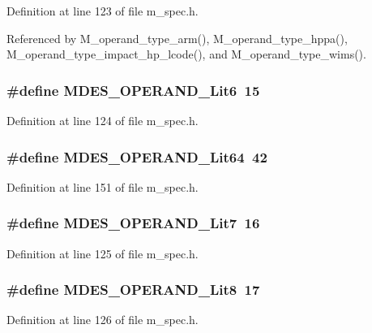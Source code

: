 Definition at line 123 of file m\_\-spec.h.

Referenced by M\_\-operand\_\-type\_\-arm(), M\_\-operand\_\-type\_\-hppa(), M\_\-operand\_\-type\_\-impact\_\-hp\_\-lcode(), and M\_\-operand\_\-type\_\-wims().
\subsubsection{\setlength{\rightskip}{0pt plus 5cm}\#define MDES\_\-OPERAND\_\-Lit6~15}\label{m__spec_8h_460183de4edc1e8037b46baef0541f79}




Definition at line 124 of file m\_\-spec.h.
\subsubsection{\setlength{\rightskip}{0pt plus 5cm}\#define MDES\_\-OPERAND\_\-Lit64~42}\label{m__spec_8h_0714b0d7799717c4741afb716e9813c5}




Definition at line 151 of file m\_\-spec.h.
\subsubsection{\setlength{\rightskip}{0pt plus 5cm}\#define MDES\_\-OPERAND\_\-Lit7~16}\label{m__spec_8h_d556410069b81eeaf761b1f1aa869981}




Definition at line 125 of file m\_\-spec.h.
\subsubsection{\setlength{\rightskip}{0pt plus 5cm}\#define MDES\_\-OPERAND\_\-Lit8~17}\label{m__spec_8h_7f82882401d08c2d7a0d94f7b680e9fb}




Definition at line 126 of file m\_\-spec.h.
